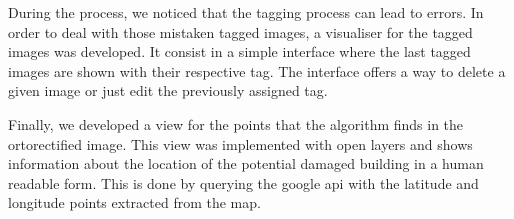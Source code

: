 \begin{figure}[h]
  \begin{center}
  \end{center}
\end{figure}

During the process, we noticed that the tagging process can lead to errors. In order to deal with those mistaken tagged images, a visualiser for the tagged images was developed. It consist in a simple interface where the last tagged images are shown with their respective tag. The interface offers a way to delete a given image or just edit the previously assigned tag.

\begin{figure}[h]
  \begin{center}
  \end{center}
\end{figure}
Finally, we developed a view for the points that the algorithm finds in the ortorectified image. This view was implemented with open layers and shows information about the location of the potential damaged building in a human readable form. This is done by querying the google api with the latitude and longitude points extracted from the map.

